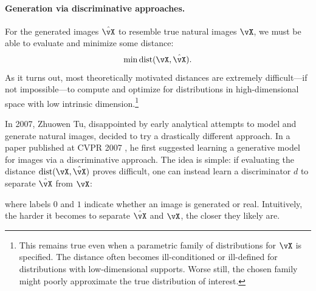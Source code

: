 \documentclass[../../book-main.tex]{subfiles}
\begin{document}
\paragraph{Generation via discriminative approaches.}
For the generated images \(\hat{\vX}\) to resemble true natural
images \(\vX\), we must be able to evaluate and minimize some distance:
\begin{equation}
    \min \operatorname{dist}(\vX, \hat{\vX}).
\end{equation}
As it turns out, most theoretically motivated distances are extremely
difficult---if not impossible---to compute and optimize for
distributions in high-dimensional space with low intrinsic
dimension.\footnote{This remains true even when a parametric family
    of distributions for \(\vX\) is specified. The distance often becomes
    ill-conditioned or ill-defined for distributions with low-dimensional
    supports. Worse still, the chosen family might poorly approximate the
true distribution of interest.}

In 2007, Zhuowen Tu, disappointed by early analytical attempts to
model and generate natural images, decided to try a drastically
different approach. In a paper published at CVPR 2007 \cite{Tu-2007},
he first suggested learning a generative model for images via a
discriminative approach. The idea is simple: if evaluating the
distance \(\operatorname{dist}(\vX, \hat{\vX})\) proves difficult,
one can instead learn a discriminator \(d\) to separate \(\hat{\vX}\)
from \(\vX\):

\begin{figure}[h!]
    \centering
    \label{fig:gan-networks}
\end{figure}

where labels \(0\) and \(1\) indicate whether an image is generated or real.
Intuitively, the harder it becomes to separate \(\hat{\vX}\) and
\(\vX\), the closer they likely are.
\end{document}
